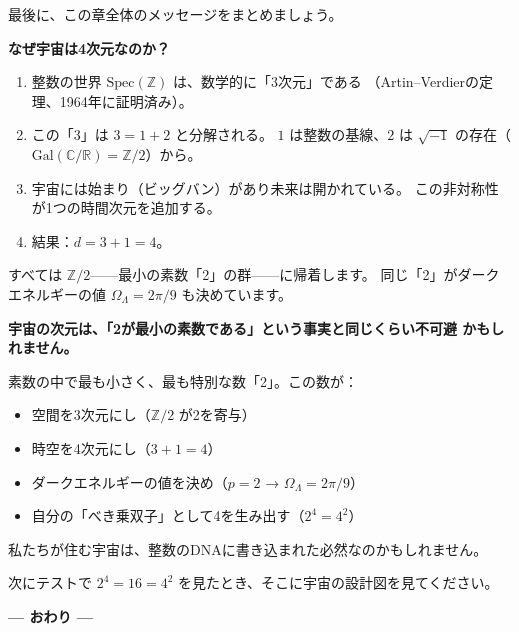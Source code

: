 \documentclass[12pt,a4paper]{article}
\begin{document}
最後に、この章全体のメッセージをまとめましょう。

\begin{keypoint}[まとめ]
\textbf{なぜ宇宙は4次元なのか？}

\begin{enumerate}[label=\textbf{Step \arabic*:}]
  \item 整数の世界 $\mathrm{Spec}(\mathbb{Z})$ は、数学的に「3次元」である
    （Artin--Verdierの定理、1964年に証明済み）。
  \item この「3」は $3 = 1 + 2$ と分解される。
    $1$ は整数の基線、$2$ は $\sqrt{-1}$ の存在（$\mathrm{Gal}(\mathbb{C}/\mathbb{R}) = \mathbb{Z}/2$）から。
  \item 宇宙には始まり（ビッグバン）があり未来は開かれている。
    この非対称性が1つの時間次元を追加する。
  \item 結果：$d = 3 + 1 = 4$。
\end{enumerate}

すべては $\mathbb{Z}/2$——最小の素数「2」の群——に帰着します。
同じ「2」がダークエネルギーの値 $\Omega_\Lambda = 2\pi/9$ も決めています。
\end{keypoint}

\begin{funfact}[最後に]
\textbf{宇宙の次元は、「2が最小の素数である」という事実と同じくらい不可避
かもしれません。}

素数の中で最も小さく、最も特別な数「2」。この数が：
\begin{itemize}
  \item 空間を3次元にし（$\mathbb{Z}/2$ が2を寄与）
  \item 時空を4次元にし（$3+1=4$）
  \item ダークエネルギーの値を決め（$p=2$ → $\Omega_\Lambda = 2\pi/9$）
  \item 自分の「べき乗双子」として4を生み出す（$2^4 = 4^2$）
\end{itemize}

私たちが住む宇宙は、整数のDNAに書き込まれた必然なのかもしれません。

次にテストで $2^4 = 16 = 4^2$ を見たとき、そこに宇宙の設計図を見てください。
\end{funfact}

\vspace{2em}

\begin{center}
\Large\textbf{--- おわり ---}
\end{center}

\vspace{1em}
\end{document}
